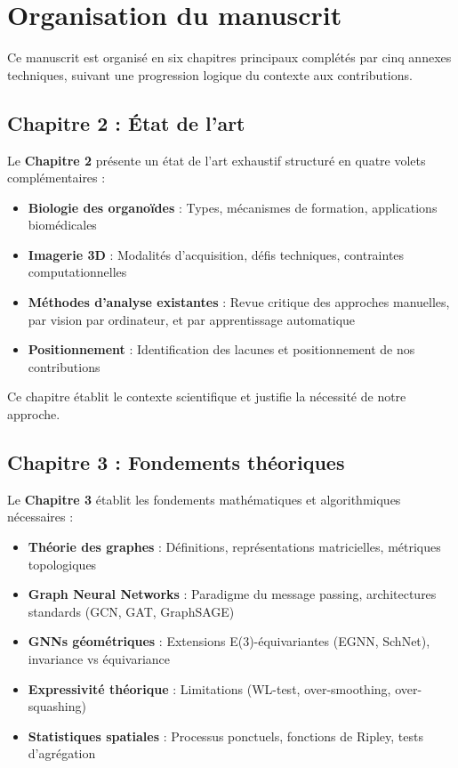 \section{Organisation du manuscrit}

Ce manuscrit est organisé en six chapitres principaux complétés par cinq annexes techniques, suivant une progression logique du contexte aux contributions.

\subsection{Chapitre 2 : État de l'art}

Le \textbf{Chapitre 2} présente un état de l'art exhaustif structuré en quatre volets complémentaires :
\begin{itemize}
    \item \textbf{Biologie des organoïdes} : Types, mécanismes de formation, applications biomédicales
    \item \textbf{Imagerie 3D} : Modalités d'acquisition, défis techniques, contraintes computationnelles
    \item \textbf{Méthodes d'analyse existantes} : Revue critique des approches manuelles, par vision par ordinateur, et par apprentissage automatique
    \item \textbf{Positionnement} : Identification des lacunes et positionnement de nos contributions
\end{itemize}

Ce chapitre établit le contexte scientifique et justifie la nécessité de notre approche.

\subsection{Chapitre 3 : Fondements théoriques}

Le \textbf{Chapitre 3} établit les fondements mathématiques et algorithmiques nécessaires :
\begin{itemize}
    \item \textbf{Théorie des graphes} : Définitions, représentations matricielles, métriques topologiques
    \item \textbf{Graph Neural Networks} : Paradigme du message passing, architectures standards (GCN, GAT, GraphSAGE)
    \item \textbf{GNNs géométriques} : Extensions E(3)-équivariantes (EGNN, SchNet), invariance vs équivariance
    \item \textbf{Expressivité théorique} : Limitations (WL-test, over-smoothing, over-squashing)
    \item \textbf{Statistiques spatiales} : Processus ponctuels, fonctions de Ripley, tests d'agrégation
\end{itemize}

